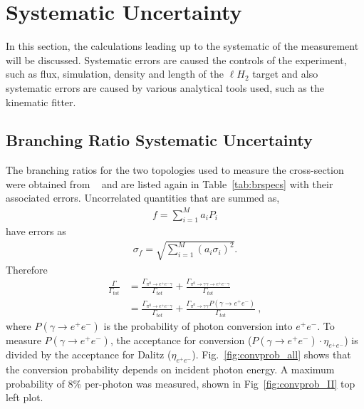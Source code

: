 \section{Systematic Uncertainty}\label{sec:results.systematics}

In this section, the calculations leading up to the systematic of the measurement will be discussed. Systematic errors are caused the controls of the experiment, such as flux, simulation, density and length of the $\ell H_2$ target and also systematic errors are caused by various analytical tools used, such as the kinematic fitter.
\subsection{Branching Ratio Systematic Uncertainty}
The branching ratios for the two topologies used to measure the cross-section were obtained from \label{abbr:pdg}~\cite{pdg} and are listed again in Table~\ref{tab:brspecs} with their associated errors. Uncorrelated quantities that are summed as,
\begin{align}
f = \sum_{i = 1}^{M}a_iP_i  
\end{align}
have errors as
\begin{align}
\sigma_f = \sqrt{\sum_{i = 1}^{M}\left(a_i\sigma_i\right)^2}.  
\end{align}
Therefore
\begin{align}
 \frac{\Gamma}{\Gamma_{tot}} &  = \frac{\Gamma_{\pi^{0}\rightarrow e^{+}e^{-}\gamma}}{\Gamma_{tot}} + \frac{\Gamma_{\pi^{0}\rightarrow \gamma \gamma \to e^{+}e^{-}\gamma}}{\Gamma_{tot}}  \\ & = \frac{\Gamma_{\pi^{0}\rightarrow e^{+}e^{-}\gamma}}{\Gamma_{tot}} + \frac{\Gamma_{\pi^{0}\rightarrow \gamma \gamma}P(\gamma \to  e^{+}e^{-})}{\Gamma_{tot}} \ ,
\end{align}
where $P(\gamma \to  e^{+}e^{-})$ is the probability of photon conversion into $e^+e^-$. To measure $P(\gamma \to  e^{+}e^{-})$, the acceptance for conversion ($P(\gamma \to  e^{+}e^{-})\cdot\eta_{e^+e^-}$) is divided by the acceptance for Dalitz ($\eta_{e^+e^-}$). Fig.~\ref{fig:convprob_all} shows that the conversion probability depends on incident photon energy. A maximum probability of 8\%  per-photon was measured, shown in Fig~\ref{fig:convprob_II} top left plot. 
